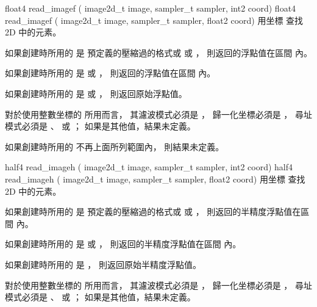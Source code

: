 float4 read_imagef (
	image2d_t image,
	sampler_t sampler,
	int2 coord)
float4 read_imagef (
	image2d_t image,
	sampler_t sampler,
	float2 coord)
\stopbuffer
{}
用坐標  查找 2D   中的元素。

如果創建時所用的  是
預定義的壓縮過的格式或  或 ，
則返回的浮點值在區間 \math{[0.0 \cdots 1.0]} 內。

如果創建時所用的  是
  或 ，
則返回的浮點值在區間 \math{[-1.0 \cdots 1.0]} 內。

如果創建時所用的  是
  或 ，
則返回原始浮點值。

對於使用整數坐標的  所用而言，
其濾波模式必須是 ，
歸一化坐標必須是 ，
尋址模式必須是 、 
 或 ；
如果是其他值，結果未定義。

如果創建時所用的  不再上面所列範圍內，
則結果未定義。
\stopbuffer

half4 read_imageh (
	image2d_t image,
	sampler_t sampler,
	int2 coord)
half4 read_imageh (
	image2d_t image,
	sampler_t sampler,
	float2 coord)
\stopbuffer
{}
用坐標  查找 2D   中的元素。

如果創建時所用的  是
預定義的壓縮過的格式或  或 ，
則返回的半精度浮點值在區間 \math{[0.0 \cdots 1.0]} 內。

如果創建時所用的  是
  或 ，
則返回的半精度浮點值在區間 \math{[-1.0 \cdots 1.0]} 內。

如果創建時所用的  是 ，
則返回原始半精度浮點值。

對於使用整數坐標的  所用而言，
其濾波模式必須是 ，
歸一化坐標必須是 ，
尋址模式必須是 、 
 或 ；
如果是其他值，結果未定義。

